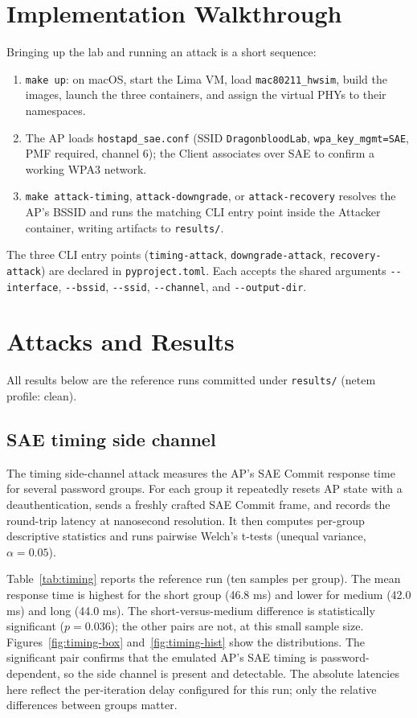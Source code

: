 \documentclass[11pt,letterpaper]{article}
\newcommand{\code}[1]{\texttt{\small #1}}
\begin{document}
\section{Implementation Walkthrough}
Bringing up the lab and running an attack is a short sequence:
\begin{enumerate}
  \item \code{make up}: on macOS, start the Lima VM, load
    \code{mac80211\_hwsim}, build the images, launch the three containers, and
    assign the virtual PHYs to their namespaces.
  \item The AP loads \code{hostapd\_sae.conf} (SSID \code{DragonbloodLab},
    \code{wpa\_key\_mgmt=SAE}, PMF required, channel 6); the Client associates
    over SAE to confirm a working WPA3 network.
  \item \code{make attack-timing}, \code{attack-downgrade}, or
    \code{attack-recovery} resolves the AP's BSSID and runs the matching CLI
    entry point inside the Attacker container, writing artifacts to
    \code{results/}.
\end{enumerate}
The three CLI entry points (\code{timing-attack}, \code{downgrade-attack},
\code{recovery-attack}) are declared in \code{pyproject.toml}. Each accepts the
shared arguments \code{-{}-interface}, \code{-{}-bssid}, \code{-{}-ssid},
\code{-{}-channel}, and \code{-{}-output-dir}.

\section{Attacks and Results}
\label{sec:results}
All results below are the reference runs committed under \code{results/}
(netem profile: clean).

\subsection{SAE timing side channel}
The timing side-channel attack measures the AP's SAE Commit response time for
several password groups. For each group it repeatedly resets AP state with a
deauthentication, sends a freshly crafted SAE Commit frame, and records the
round-trip latency at nanosecond resolution. It then computes per-group
descriptive statistics and runs pairwise Welch's t-tests (unequal variance,
$\alpha = 0.05$).

Table~\ref{tab:timing} reports the reference run (ten samples per group). The
mean response time is highest for the short group (46.8 ms) and lower for medium
(42.0 ms) and long (44.0 ms). The short-versus-medium difference is
statistically significant ($p = 0.036$); the other pairs are not, at this small
sample size. Figures~\ref{fig:timing-box} and~\ref{fig:timing-hist} show the
distributions. The significant pair confirms that the emulated AP's SAE timing is
password-dependent, so the side channel is present and detectable. The absolute
latencies here reflect the per-iteration delay configured for this run; only the
relative differences between groups matter.
\end{document}
